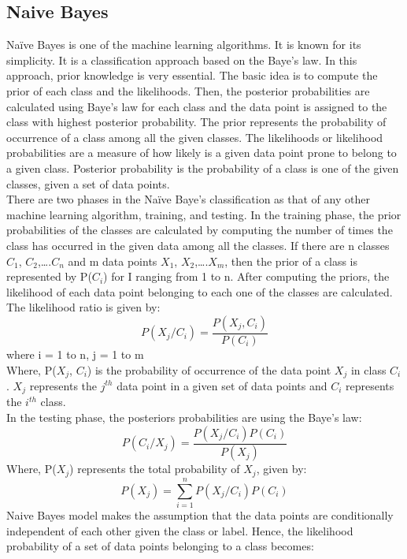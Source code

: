 \documentclass[sigconf]{acmart}
\begin{document}
\subsection{Naive Bayes}
Naïve Bayes is one of the machine learning algorithms. It is known for its simplicity. It is a classification approach based on the Baye’s law. In this approach, prior knowledge is very essential. The basic idea is to compute the prior of each class and the likelihoods. Then, the posterior probabilities are calculated using Baye’s law for each class and the data point is assigned to the class with highest posterior probability. The prior represents the probability of occurrence of a class among all the given classes. The likelihoods or likelihood probabilities are a measure of how likely is a given data point prone to belong to a given class. Posterior probability is the probability of a class is one of the given classes, given a set of data points.\cite{Crandall} \\
There are two phases in the Naïve Baye’s classification as that of any other machine learning algorithm, training, and testing.  In the training phase, the prior probabilities of the classes are calculated by computing the number of times the class has occurred in the given data among all the classes. If there are n classes $C_1$, $C_2$,….$C_n$ and m data points $X_1$, $X_2$,….$X_m$, then the prior of a class is represented by P($C_i$) for I ranging from 1 to n. After computing the priors, the likelihood of each data point belonging to each one of the classes are calculated. The likelihood ratio is given by:\cite{Crandall}
\begin{equation}
    P(X_j/C_i) = \frac{P(X_j, C_i)}{P(C_i)}
\end{equation}
where i = 1 to n, j = 1 to m\\
Where, P($X_j$, $C_i$) is the probability of occurrence of the data point $X_j$ in class $C_i$. $X_j$ represents the $j^{th}$ data point in a given set of data points and $C_i$ represents the $i^{th}$ class.\cite{Crandall}\\
In the testing phase, the posteriors probabilities are using the Baye’s law:
\begin{equation}
    P(C_i/X_j) = \frac{P(X_j/ C_i) P(C_i)}{P(X_j) }	
\end{equation}
Where, P($X_j$) represents the total probability of $X_j$, given by:
\begin{equation}
    P(X_j) = \sum_{i=1}^{n}P(X_j/ C_i)P(C_i)
\end{equation}
Naive Bayes model makes the assumption that the data points are conditionally independent of each other given the class or label. Hence, the likelihood probability of a set of data points belonging to a class becomes:\cite{Crandall}
\end{document}
